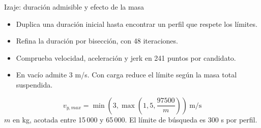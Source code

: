\documentclass[aspectratio=169,11pt]{beamer}
\begin{document}
\begin{frame}[t,label=trayectoria4]{Izaje: duración admisible y efecto de la masa}
\begin{itemize}
\item Duplica una duración inicial hasta encontrar un perfil que respete los límites.
\item Refina la duración por bisección, con 48 iteraciones.
\item Comprueba velocidad, aceleración y jerk en 241 puntos por candidato.
\item En vacío admite 3 m/s. Con carga reduce el límite según la masa total suspendida.
\end{itemize}
\[
v_{y,max}=\min\left(3,\max\left(1{,}5,\frac{97500}{m}\right)\right)\ \mathrm{m/s}
\]
\small $m$ en kg, acotada entre 15\,000 y 65\,000. El límite de búsqueda es 300 s por perfil.

\end{frame}
\end{document}
